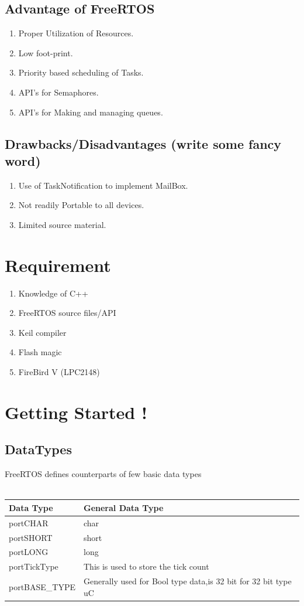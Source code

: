 \documentclass[11pt,a4paper]{article}
\begin{document}
	\subsection{Advantage of FreeRTOS}
	\begin{enumerate}
		\item Proper Utilization of Resources.
		\item Low foot-print.
		\item Priority based scheduling of Tasks.
		\item API's for Semaphores.
		\item API's for Making and managing queues.
	\end{enumerate} 

	\subsection{Drawbacks/Disadvantages (write some fancy word)}
	\begin{enumerate}
		\item Use of TaskNotification to implement MailBox.
		\item Not readily Portable to all devices.
		\item Limited source material.
	\end{enumerate} 
\newpage
\section{Requirement}
\begin{enumerate}
	\item Knowledge of C++ 
	\item FreeRTOS source files/API
	\item Keil compiler
	\item Flash magic
	\item FireBird V (LPC2148)
\end{enumerate}


\section{Getting Started !}

	\subsection{DataTypes}
		FreeRTOS defines counterparts of few basic data types
		\\
		\\
\begin{tabular}{|l|l|}
	\hline
	\textbf{Data Type }&\textbf{General Data Type}\\
	 \hline
	 	portCHAR&char\\ \hline
		portSHORT&short\\ \hline
		portLONG&long\\ \hline
		portTickType&This is used to store the tick count\\ \hline
		portBASE\_TYPE&Generally used for Bool type data,is 32 bit for 32 bit type uC\\ \hline
\end{tabular}
\end{document}
